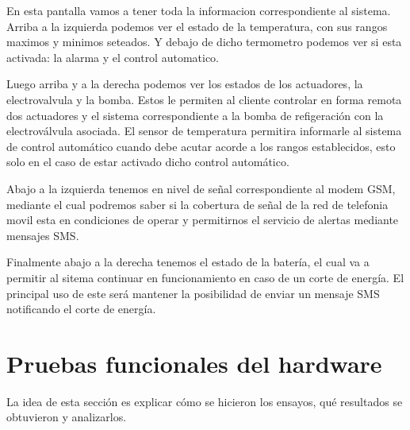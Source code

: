 En esta pantalla vamos a tener toda la informacion correspondiente al sistema. Arriba a la izquierda podemos ver el estado de la temperatura, con sus rangos maximos y minimos seteados. Y debajo de dicho termometro podemos ver si esta activada: la alarma y el control automatico.

Luego arriba y a la derecha podemos ver los estados de los actuadores, la electrovalvula y la bomba. Estos le permiten al cliente controlar en forma remota dos actuadores y el sistema correspondiente a la bomba de refigeración con la electroválvula asociada. El sensor de temperatura permitira informarle al sistema de control automático cuando debe acutar acorde a los rangos establecidos, esto solo en el caso de estar activado dicho control automático. 

Abajo a la izquierda tenemos en nivel de señal correspondiente al modem GSM, mediante el cual podremos saber si la cobertura de señal de la red de telefonia movil esta en condiciones de operar y permitirnos el servicio de alertas mediante mensajes SMS. 

Finalmente abajo a la derecha tenemos el estado de la batería, el cual va a permitir al sitema continuar en funcionamiento en caso de un corte de energía. El principal uso de este será mantener la posibilidad de enviar un mensaje SMS notificando el corte de energía.





\section{Pruebas funcionales del hardware}
\label{sec:pruebasHW}

La idea de esta sección es explicar cómo se hicieron los ensayos, qué resultados se obtuvieron y analizarlos.
